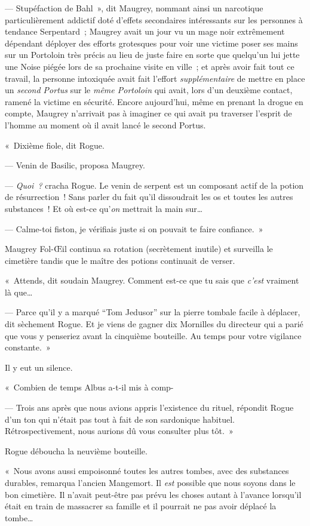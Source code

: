 --- Stupéfaction de Bahl~», dit Maugrey, nommant ainsi un narcotique particulièrement addictif doté d'effets secondaires intéressants sur les personnes à tendance Serpentard~; Maugrey avait un jour vu un mage noir extrêmement dépendant déployer des efforts grotesques pour voir une victime poser ses mains sur un Portoloin très précis au lieu de juste faire en sorte que quelqu'un lui jette une Noise piégée lors de sa prochaine visite en ville~; et après avoir fait tout ce travail, la personne intoxiquée avait fait l'effort \emph{supplémentaire} de mettre en place un \emph{second Portus} sur le \emph{même Portoloin} qui avait, lors d'un deuxième contact, ramené la victime en sécurité. Encore aujourd'hui, même en prenant la drogue en compte, Maugrey n'arrivait pas à imaginer ce qui avait pu traverser l'esprit de l'homme au moment où il avait lancé le second Portus.

«~Dixième fiole, dit Rogue.

--- Venin de Basilic, proposa Maugrey.

--- \emph{Quoi~?} cracha Rogue. Le venin de serpent est un composant actif de la potion de résurrection~! Sans parler du fait qu'il dissoudrait les os et toutes les autres substances~! Et où est-ce qu'\emph{on} mettrait la main sur…

--- Calme-toi fiston, je vérifiais juste si on pouvait te faire confiance.~»

Maugrey Fol-Œil continua sa rotation (secrètement inutile) et surveilla le cimetière tandis que le maître des potions continuait de verser.

«~Attends, dit soudain Maugrey. Comment est-ce que tu sais que \emph{c'est} vraiment là que…

--- Parce qu'il y a marqué “Tom Jedusor” sur la pierre tombale facile à déplacer, dit sèchement Rogue. Et je viens de gagner dix Mornilles du directeur qui a parié que vous y penseriez avant la cinquième bouteille. Au temps pour votre vigilance constante.~»

Il y eut un silence.

«~Combien de temps Albus a-t-il mis à comp-

--- Trois ans après que nous avions appris l'existence du rituel, répondit Rogue d'un ton qui n'était pas tout à fait de son sardonique habituel. Rétrospectivement, nous aurions dû vous consulter plus tôt.~»

Rogue déboucha la neuvième bouteille.

«~Nous avons aussi empoisonné toutes les autres tombes, avec des substances durables, remarqua l'ancien Mangemort. Il \emph{est} possible que nous soyons dans le bon cimetière. Il n'avait peut-être pas prévu les choses autant à l'avance lorsqu'il était en train de massacrer sa famille et il pourrait ne pas avoir déplacé la tombe…

